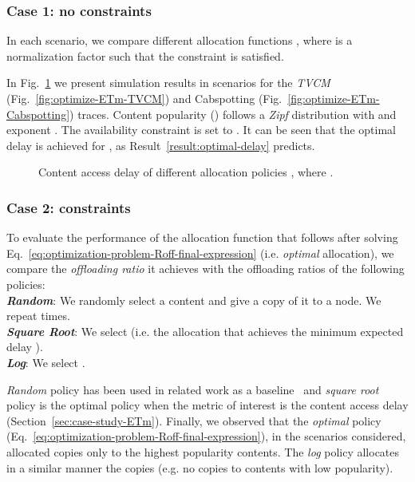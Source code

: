 \documentclass[journal]{IEEEtran}
\newcommand{\eq}[1]{Eq.~\eqref{#1}}
\begin{document}
\subsubsection{Case 1: no  constraints}
In each scenario, we compare different allocation functions , where  is a normalization factor such that the constraint  is satisfied.

In Fig.~\ref{fig:optimize-ETm} we present simulation results in scenarios for the \textit{TVCM} (Fig.~\ref{fig:optimize-ETm-TVCM}) and Cabspotting (Fig.~\ref{fig:optimize-ETm-Cabspotting}) traces. Content popularity () follows a \textit{Zipf} distribution with  and exponent . The availability constraint is set to . It can be seen that the optimal delay  is achieved for , as Result~\ref{result:optimal-delay} predicts.\begin{figure}
\centering
{}
\caption{Content access delay  of different allocation policies , where .}
\label{fig:optimize-ETm}
\end{figure}	



\subsubsection{Case 2:  constraints}
To evaluate the performance of the allocation function  that follows after solving \eq{eq:optimization-problem-Roff-final-expression} (i.e. \textit{optimal} allocation), we compare the \textit{offloading ratio}  it achieves with the offloading ratios of the following policies:\\
\textit{\textbf{Random}}: We randomly select a content and give a copy of it to a node. We repeat  times.\\
\textit{\textbf{Square Root}}: We select  (i.e. the allocation that achieves the minimum expected delay ).\\
\textit{\textbf{Log}}: We select .

\textit{Random} policy has been used in related work as a baseline~\cite{multiple-offloading} and \textit{square root} policy is the optimal policy when the metric of interest is the content access delay (Section~\ref{sec:case-study-ETm}). Finally, we observed that the \textit{optimal} policy (\eq{eq:optimization-problem-Roff-final-expression}), in the scenarios considered, allocated copies only to the  highest popularity contents. The \textit{log} policy allocates in a similar manner the copies (e.g. no copies to contents with low popularity).
\end{document}
